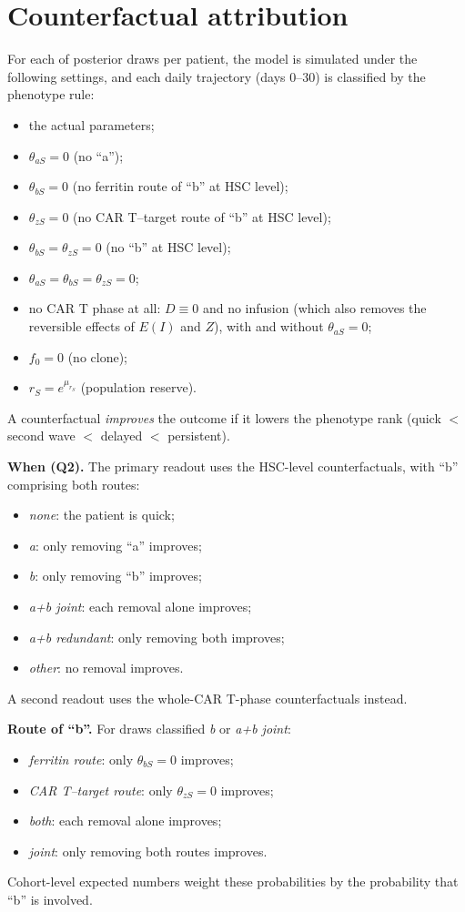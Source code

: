\documentclass[11pt]{article}
\begin{document}
\section{Counterfactual attribution}
For each of \valAttrib{} posterior draws per patient, the model is simulated under the following settings, and each daily trajectory (days 0--30) is classified by the phenotype rule:
\begin{itemize}
\item the actual parameters;
\item $\theta_{aS}=0$ (no ``a'');
\item $\theta_{bS}=0$ (no ferritin route of ``b'' at HSC level);
\item $\theta_{zS}=0$ (no CAR T--target route of ``b'' at HSC level);
\item $\theta_{bS}=\theta_{zS}=0$ (no ``b'' at HSC level);
\item $\theta_{aS}=\theta_{bS}=\theta_{zS}=0$;
\item no CAR T phase at all: $D\equiv0$ and no infusion (which also removes the reversible effects of $E(I)$ and $Z$), with and without $\theta_{aS}=0$;
\item $f_0=0$ (no clone);
\item $r_S=e^{\mu_{r_S}}$ (population reserve).
\end{itemize}
A counterfactual \emph{improves} the outcome if it lowers the phenotype rank (quick $<$ second wave $<$ delayed $<$ persistent).

\textbf{When (Q2).} The primary readout uses the HSC-level counterfactuals, with ``b'' comprising both routes:
\begin{itemize}
\item \emph{none}: the patient is quick;
\item \emph{a}: only removing ``a'' improves;
\item \emph{b}: only removing ``b'' improves;
\item \emph{a+b joint}: each removal alone improves;
\item \emph{a+b redundant}: only removing both improves;
\item \emph{other}: no removal improves.
\end{itemize}
A second readout uses the whole-CAR T-phase counterfactuals instead.

\textbf{Route of ``b''.} For draws classified \emph{b} or \emph{a+b joint}:
\begin{itemize}
\item \emph{ferritin route}: only $\theta_{bS}=0$ improves;
\item \emph{CAR T--target route}: only $\theta_{zS}=0$ improves;
\item \emph{both}: each removal alone improves;
\item \emph{joint}: only removing both routes improves.
\end{itemize}
Cohort-level expected numbers weight these probabilities by the probability that ``b'' is involved.
\end{document}
